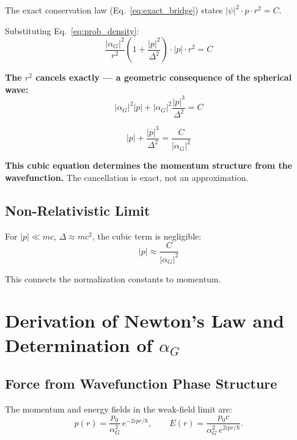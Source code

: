 \documentclass[11pt,a4paper]{article}
\theoremstyle{definition}
\theoremstyle{remark}
\begin{document}
	The exact conservation law (Eq.~\eqref{eq:exact_bridge}) states $|\psi|^2 \cdot p \cdot r^2 = C$.
	
	Substituting Eq.~\eqref{eq:prob_density}:
	\begin{equation}
		\frac{|\alpha_G|^2}{r^2}\!\left(1+\frac{|p|^2}{\Delta^2}\right)\cdot|p|\cdot r^2 = C
		\label{eq:momentum_equation}
	\end{equation}
	
	\textbf{The $r^2$ cancels exactly --- a geometric consequence of the spherical wave:}
	\begin{equation}
		|\alpha_G|^2|p| + |\alpha_G|^2\frac{|p|^3}{\Delta^2} = C
	\end{equation}
	
	\begin{equation}
		\boxed{|p| + \frac{|p|^3}{\Delta^2} = \frac{C}{|\alpha_G|^2}}
		\label{eq:cubic}
	\end{equation}
	
	\textbf{This cubic equation determines the momentum structure from the wavefunction.}  The cancellation is exact, not an approximation.
	
	\subsection{Non-Relativistic Limit}
	
	For $|p|\ll mc$, $\Delta\approx mc^2$, the cubic term is negligible:
	\begin{equation}
		\boxed{|p| \approx \frac{C}{|\alpha_G|^2}}
		\label{eq:nr_momentum}
	\end{equation}
	
	This connects the normalization constants to momentum.
	
	\section{Derivation of Newton's Law and Determination of $\alpha_G$}
	\label{sec:newton}
	
	\subsection{Force from Wavefunction Phase Structure}
	
	The momentum and energy fields in the weak-field limit are:
	\begin{equation}
		p(r) = \frac{p_0}{\alpha_G^2}\,e^{-2ipr/\hbar}, \qquad
		E(r) = \frac{p_0 c}{\alpha_G^2\,e^{2ipr/\hbar}}.
	\end{equation}
	
\end{document}
